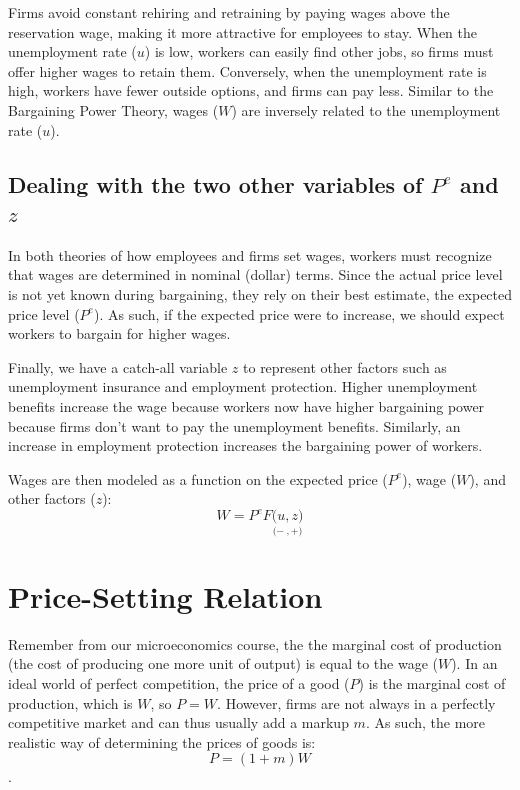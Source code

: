 \documentclass{extarticle}
\begin{document}
Firms avoid constant rehiring and retraining by paying wages above the reservation wage, making it more attractive for employees to stay. 
When the unemployment rate ($u$) is low, workers can easily find other jobs, so firms must offer higher wages to retain them. 
Conversely, when the unemployment rate is high, workers have fewer outside options, and firms can pay less. 
Similar to the Bargaining Power Theory, wages ($W$) are inversely related to the unemployment rate ($u$).

\subsection{Dealing with the two other variables of $P^e$ and $z$}
In both theories of how employees and firms set wages, workers must recognize that wages are determined in nominal (dollar) terms. 
Since the actual price level is not yet known during bargaining, they rely on their best estimate, the expected price level ($P^e$). As such, if the expected price were to increase, we should expect workers to bargain for higher wages.

Finally, we have a catch-all variable $z$ to represent other factors such as unemployment insurance and employment protection. Higher unemployment benefits increase the wage because workers now have higher bargaining power because firms don't want to pay the unemployment benefits. Similarly, an increase in employment protection increases the bargaining power of workers.

Wages are then modeled as a function on the expected price ($P^e$), wage ($W$), and other factors ($z$):
$$W = P^e F\underset{(-}{(u}\underset{, +)}{, z)} $$

\section{Price-Setting Relation}
Remember from our microeconomics course, the the marginal cost of production (the cost
of producing one more unit of output) is equal to the wage ($W$). In an ideal world of perfect competition, the price of a good ($P$) is the marginal cost of production, which is $W$, so $P = W$. However, firms are not always in a perfectly competitive market and can thus usually add a markup $m$. As such, the more realistic way of determining the prices of goods is:
$$P = (1+m) W$$.
\end{document}
